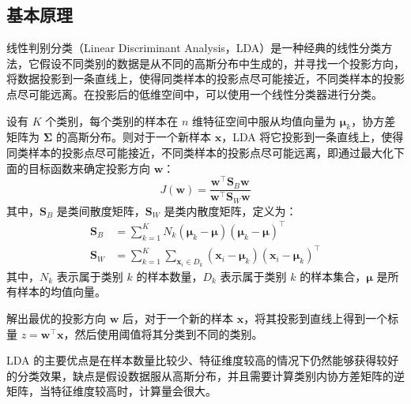 \documentclass[a4paper,12pt,onecolumn,oneside]{article}
\begin{document}
\subsection{基本原理}
线性判别分类（Linear Discriminant Analysis，LDA）是一种经典的线性分类方法，它假设不同类别的数据是从不同的高斯分布中生成的，并寻找一个投影方向，将数据投影到一条直线上，使得同类样本的投影点尽可能接近，不同类样本的投影点尽可能远离。在投影后的低维空间中，可以使用一个线性分类器进行分类。\par 
设有 $K$ 个类别，每个类别的样本在 $n$ 维特征空间中服从均值向量为 $\boldsymbol{\mu}_k$，协方差矩阵为 $\boldsymbol{\Sigma}$ 的高斯分布。则对于一个新样本 $\mathbf{x}$，LDA 将它投影到一条直线上，使得同类样本的投影点尽可能接近，不同类样本的投影点尽可能远离，即通过最大化下面的目标函数来确定投影方向 $\mathbf{w}$：
$$
J(\mathbf{w})=\frac{\mathbf{w}^\top\mathbf{S}_B\mathbf{w}}{\mathbf{w}^\top\mathbf{S}_W\mathbf{w}}
$$
其中，$\mathbf{S}_B$ 是类间散度矩阵，$\mathbf{S}_W$ 是类内散度矩阵，定义为：
$$\begin{aligned}
	\mathbf{S}_B &= \sum_{k=1}^{K}N_k(\boldsymbol{\mu}_k - \boldsymbol{\mu})(\boldsymbol{\mu}_k - \boldsymbol{\mu})^\top \\
	\mathbf{S}_W &= \sum_{k=1}^{K}\sum_{\mathbf{x}_i\in D_k}(\mathbf{x}_i - \boldsymbol{\mu}_k)(\mathbf{x}_i - \boldsymbol{\mu}_k)^\top
\end{aligned}$$
其中，$N_k$ 表示属于类别 $k$ 的样本数量，$D_k$ 表示属于类别 $k$ 的样本集合，$\boldsymbol{\mu}$ 是所有样本的均值向量。\par 
解出最优的投影方向 $\mathbf{w}$ 后，对于一个新的样本 $\mathbf{x}$，将其投影到直线上得到一个标量 $z=\mathbf{w}^\top\mathbf{x}$，然后使用阈值将其分类到不同的类别。\par 
LDA 的主要优点是在样本数量比较少、特征维度较高的情况下仍然能够获得较好的分类效果，缺点是假设数据服从高斯分布，并且需要计算类别内协方差矩阵的逆矩阵，当特征维度较高时，计算量会很大。
\end{document}
